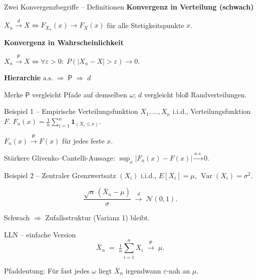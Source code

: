 \documentclass[aspectratio=169]{beamer}
\begin{document}
\begin{frame}{Zwei Konvergenzbegriffe – Definitionen}
\small
\textbf{Konvergenz in Verteilung (schwach)}

$X_n \xrightarrow{d} X 
\iff 
F_{X_n}(x)\to F_X(x)$ für alle Stetigkeitspunkte $x$.

\vspace{0.6em}
\textbf{Konvergenz in Wahrscheinlichkeit}

$X_n \xrightarrow{\mathsf P} X
\iff
\forall\varepsilon>0:\;
P(|X_n-X|>\varepsilon)\to0$.

\vspace{0.6em}
\textbf{Hierarchie}\; $\text{a.s.}\;\Rightarrow\;\mathsf P\;\Rightarrow\;d$

\begin{block}{Merke}
$\mathsf P$ vergleicht Pfade auf demselben $\omega$;  
$d$ vergleicht bloß Randverteilungen.
\end{block}
\end{frame}

\begin{frame}{Beispiel 1 – Empirische Verteilungsfunktion}
\small
$X_1,\dots,X_n$ i.i.d., Verteilungsfunktion $F$.  
$F_n(x)=\tfrac1n\sum_{i=1}^n\mathbf1_{(X_i\le x)}$.

$F_n(x)\xrightarrow{\mathsf P}F(x)$ für jedes feste $x$.

\vspace{0.4em}
Stärkere Glivenko–Cantelli-Aussage:  
$\sup_x|F_n(x)-F(x)|\xrightarrow{a.s.}0$.
\end{frame}

\begin{frame}{Beispiel 2 – Zentraler Grenzwertsatz}
\small
$(X_i)$ i.i.d., $E[X_i]=\mu$, $\operatorname{Var}(X_i)=\sigma^2$.

\[
\frac{\sqrt n\,(\bar X_n-\mu)}{\sigma}
\;\xrightarrow{d}\;
\mathcal N(0,1).
\]

Schwach $\Rightarrow$ Zufalls­struktur (Varianz 1) bleibt.
\end{frame}

\begin{frame}{LLN – einfache Version}
\small
\[
\bar X_n\;=\;\tfrac1n\sum_{i=1}^n X_i
\;\xrightarrow{\mathsf P}\;\mu.
\]

Pfaddeutung: Für fast jedes $\omega$ liegt $\bar X_n$ irgendwann $\varepsilon$-nah an $\mu$.
\end{frame}
\end{document}
